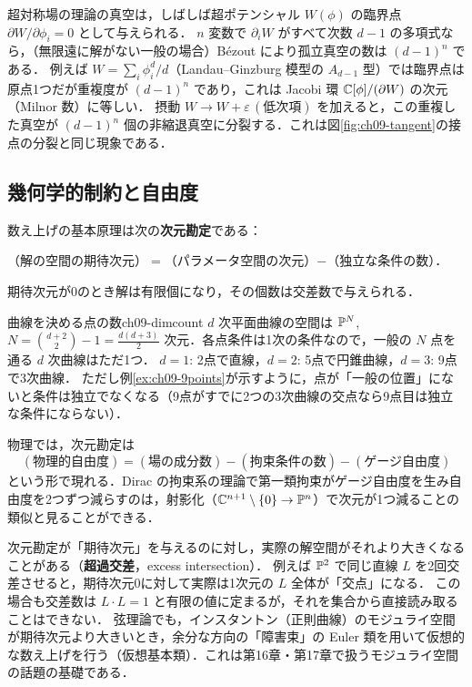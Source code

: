 \begin{physbox}[連立方程式の解の数と真空の数]
超対称場の理論の真空は，しばしば超ポテンシャル $W(\phi)$ の臨界点 $\partial W/\partial\phi_i=0$ として与えられる．
$n$ 変数で $\partial_iW$ がすべて次数 $d-1$ の多項式なら，（無限遠に解がない一般の場合）B\'ezout により孤立真空の数は $(d-1)^n$ である．
例えば $W=\sum_i\phi_i^{d}/d$（Landau--Ginzburg 模型の $A_{d-1}$ 型）では臨界点は原点1つだが重複度が $(d-1)^n$ であり，これは Jacobi 環 $\mathbb{C}[\phi]/(\partial W)$ の次元（Milnor 数）に等しい．
摂動 $W\to W+\varepsilon\,(\text{低次項})$ を加えると，この重複した真空が $(d-1)^n$ 個の非縮退真空に分裂する．これは図\ref{fig:ch09-tangent}の接点の分裂と同じ現象である．
\end{physbox}

\subsection{幾何学的制約と自由度}

数え上げの基本原理は次の\textbf{次元勘定}である：
\begin{center}
（解の空間の期待次元）$=$（パラメータ空間の次元）$-$（独立な条件の数）．
\end{center}
期待次元が0のとき解は有限個になり，その個数は交差数で与えられる．

\begin{myex}{曲線を決める点の数}{ch09-dimcount}
$d$ 次平面曲線の空間は $\mathbb{P}^{N}$, $N=\binom{d+2}{2}-1=\frac{d(d+3)}{2}$ 次元．各点条件は1次の条件なので，一般の $N$ 点を通る $d$ 次曲線はただ1つ．
$d=1$: 2点で直線，$d=2$: 5点で円錐曲線，$d=3$: 9点で3次曲線．
ただし例\ref{ex:ch09-9points}が示すように，点が「一般の位置」にないと条件は独立でなくなる（9点がすでに2つの3次曲線の交点なら9点目は独立な条件にならない）．
\end{myex}

物理では，次元勘定は
\[
  (\text{物理的自由度})=(\text{場の成分数})-(\text{拘束条件の数})-(\text{ゲージ自由度})
\]
という形で現れる．Dirac の拘束系の理論で第一類拘束がゲージ自由度を生み自由度を2つずつ減らすのは，射影化（$\mathbb{C}^{n+1}\setminus\{0\}\to\mathbb{P}^n$）で次元が1つ減ることの類似と見ることができる．

\begin{physbox}[期待次元と超過交差]
次元勘定が「期待次元」を与えるのに対し，実際の解空間がそれより大きくなることがある（\textbf{超過交差}，excess intersection）．
例えば $\mathbb{P}^2$ で同じ直線 $L$ を2回交差させると，期待次元0に対して実際は1次元の $L$ 全体が「交点」になる．
この場合も交差数は $L\cdot L=1$ と有限の値に定まるが，それを集合から直接読み取ることはできない．
弦理論でも，インスタントン（正則曲線）のモジュライ空間が期待次元より大きいとき，余分な方向の「障害束」の Euler 類を用いて仮想的な数え上げを行う（仮想基本類）．これは第16章・第17章で扱うモジュライ空間の話題の基礎である．
\end{physbox}


